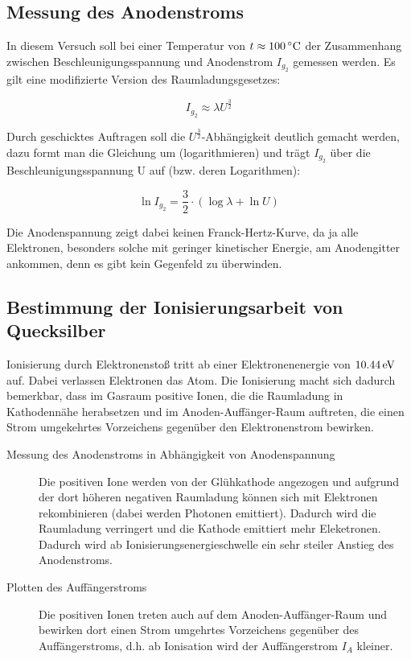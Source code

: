 \documentclass[a4paper,titlepage]{scrartcl}
\numberwithin{equation}{section}
\begin{document}
\subsection{Messung des Anodenstroms}

In diesem Versuch soll bei einer Temperatur von $t \approx \unit[100]{^\circ C}$ der Zusammenhang zwischen Beschleunigungsspannung und Anodenstrom $I_{g_2}$ gemessen werden. Es gilt eine modifizierte Version des Raumladungsgesetzes:

\begin{equation*}
I_{g_2} \approx \lambda U^{\frac{3}{2}}
\end{equation*}

Durch geschicktes Auftragen soll die $U^{\frac{3}{2}}$-Abhängigkeit deutlich gemacht werden, dazu formt man die Gleichung um (logarithmieren) und trägt $I_{g_2}$ über die Beschleunigungsspannung U auf (bzw. deren Logarithmen):

\begin{equation*}
\ln{I_{g_2}} =  \frac{3}{2} \cdot \left( \log{\lambda} + \ln{U} \right)
\end{equation*}

Die Anodenspannung zeigt dabei keinen Franck-Hertz-Kurve, da ja alle Elektronen, besonders solche mit geringer kinetischer Energie, am Anodengitter ankommen, denn es gibt kein Gegenfeld zu überwinden.

\subsection{Bestimmung der Ionisierungsarbeit von Quecksilber}
Ionisierung durch Elektronenstoß tritt ab einer Elektronenenergie von $\unit[10.44]{eV}$ auf. Dabei verlassen Elektronen das Atom. Die Ionisierung macht sich dadurch bemerkbar, dass im Gasraum positive Ionen, die die Raumladung in Kathodennähe herabsetzen und im Anoden-Auffänger-Raum auftreten, die einen Strom umgekehrtes Vorzeichens gegenüber den Elektronenstrom bewirken.

\begin{description}
\item[Messung des Anodenstroms in Abhängigkeit von Anodenspannung] Die positiven Ione werden von der Glühkathode angezogen und aufgrund der dort höheren negativen Raumladung können sich mit Elektronen rekombinieren (dabei werden Photonen emittiert). Dadurch wird die Raumladung verringert und die Kathode emittiert mehr Eleketronen. Dadurch wird ab Ionisierungsenergieschwelle ein sehr steiler Anstieg des Anodenstroms.
\item[Plotten des Auffängerstroms] Die positiven Ionen treten auch auf dem Anoden-Auffänger-Raum und bewirken dort einen Strom umgehrtes Vorzeichens gegenüber des Auffängerstroms, d.h. ab Ionisation wird der Auffängerstrom $I_A$ kleiner.
\end{description}
\end{document}
